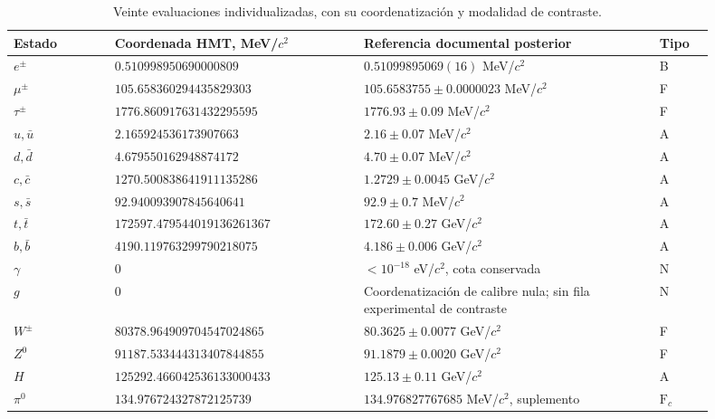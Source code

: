 \begingroup
\small
\setlength{\tabcolsep}{3pt}
\begin{table}[!htbp]
\centering\fontsize{8.8}{10.2}\selectfont
\setlength{\tabcolsep}{4pt}\renewcommand{\arraystretch}{1.04}
\caption{Veinte evaluaciones individualizadas, con su coordenatización y modalidad de contraste.}
\label{tab:vi-evaluaciones-veinte}
\begin{tabular}{p{0.13\linewidth}p{0.32\linewidth}p{0.38\linewidth}p{0.07\linewidth}}

\toprule
Estado & Coordenada HMT, MeV/\(c^2\) & Referencia documental posterior & Tipo\\
\midrule

\(e^\pm\) & \(0.510998950\allowbreak690000809\) & \(0.51099895069(16)\) MeV/\(c^2\) & B\\
\(\mu^\pm\) & \(105.658360294\allowbreak435829303\) & \(105.6583755\pm0.0000023\) MeV/\(c^2\) & F\\
\(\tau^\pm\) & \(1776.860917631\allowbreak432295595\) & \(1776.93\pm0.09\) MeV/\(c^2\) & F\\
\(u,\bar u\) & \(2.165924536\allowbreak173907663\) & \(2.16\pm0.07\) MeV/\(c^2\) & A\\
\(d,\bar d\) & \(4.679550162\allowbreak948874172\) & \(4.70\pm0.07\) MeV/\(c^2\) & A\\
\(c,\bar c\) & \(1270.500838641\allowbreak911135286\) & \(1.2729\pm0.0045\) GeV/\(c^2\) & A\\
\(s,\bar s\) & \(92.940093907\allowbreak845640641\) & \(92.9\pm0.7\) MeV/\(c^2\) & A\\
\(t,\bar t\) & \(172597.479544019\allowbreak136261367\) & \(172.60\pm0.27\) GeV/\(c^2\) & A\\
\(b,\bar b\) & \(4190.119763299\allowbreak790218075\) & \(4.186\pm0.006\) GeV/\(c^2\) & A\\
\(\gamma\) & \(0\) & \(<10^{-18}\) eV/\(c^2\), cota conservada & N\\
\(g\) & \(0\) & Coordenatización de calibre nula; sin fila experimental de contraste & N\\
\(W^\pm\) & \(80378.964909704\allowbreak547024865\) & \(80.3625\pm0.0077\) GeV/\(c^2\) & F\\
\(Z^0\) & \(91187.533444313\allowbreak407844855\) & \(91.1879\pm0.0020\) GeV/\(c^2\) & F\\
\(H\) & \(125292.466042536\allowbreak133000433\) & \(125.13\pm0.11\) GeV/\(c^2\) & A\\
\(\pi^0\) & \(134.976724327\allowbreak872125739\) & \(134.976827767685\) MeV/\(c^2\), suplemento & \(\mathrm F_c\)\\

\end{tabular}
\end{table}

